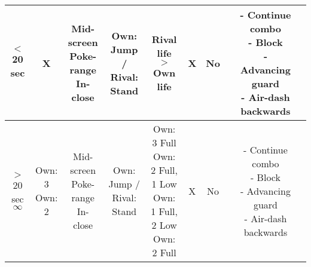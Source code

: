 \documentclass{article}
\begin{document}
\begin{landscape}
\begin{table}[h!]
\begin{center}
\begin{tabular*}{26cm}{c|c|c|c|c|c|c|c|c|c}
      \hline
      $<$ 20 sec & X & \makecell{Mid-screen \\ Poke-range \\ In-close} & Own: Jump / Rival: Stand & Rival life $>$ Own life & X & No & & \makecell{- Continue combo \\ - Block \\ - Advancing guard \\ - Air-dash backwards}\\
      \hline
      \makecell{$>$ 20 sec \\ $\infty$} & \makecell {Own: 3 \\ Own: 2} & \makecell{Mid-screen \\ Poke-range \\ In-close} & Own: Jump / Rival: Stand & \makecell {Own: 3 Full \\ Own: 2 Full, 1 Low \\ Own: 1 Full, 2 Low \\ Own: 2 Full} & X & No & & \makecell{- Continue combo \\ - Block \\ - Advancing guard \\ - Air-dash backwards}\\
      \hline
        \end{tabular*}
  \end{center}
\end{table}

\end{landscape}

\newpage
\end{document}
